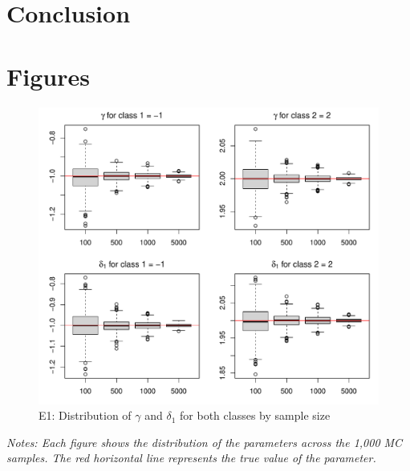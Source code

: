 \documentclass[12pt]{article}
\begin{document}
\section{Conclusion}


\pagebreak


\newpage

\section*{Figures}

\begin{figure}[H]
	\caption{E1: Distribution of $\gamma$ and $\delta_1$ for both classes by sample size}\label{fig:figure1}
	\centering
	\includegraphics[width =\textwidth]{fig1} 
\end{figure}
\noindent \textsl{Notes: Each figure shows the distribution of the parameters across the 1,000 MC samples. The red horizontal line represents the true value of the parameter.}
\end{document}
